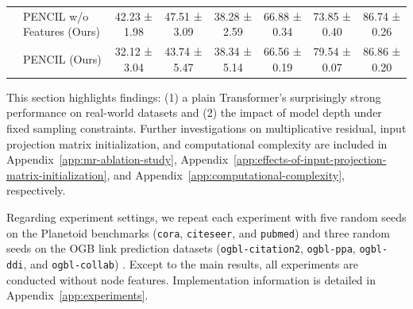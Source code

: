\documentclass{article}
\theoremstyle{plain}
\theoremstyle{definition}
\theoremstyle{remark}
\begin{document}
\begin{table}[t]
{\begin{tabular}{@{}clcccccc@{}}
             & PENCIL w/o Features (Ours) & {\color{firstbest} 42.23 ± 1.98}    & 47.51 ± 3.09                        & 38.28 ± 2.59                        & {\color{thirdbest} 66.88 ± 0.34}    & {\color{thirdbest} 73.85 ± 0.40}    & 86.74 ± 0.26                        \\
             & PENCIL (Ours)             & 32.12 ± 3.04                        & 43.74 ± 5.47                        & {\color{thirdbest} 38.34 ± 5.14}    & 66.56 ± 0.19                        & {\color{firstbest} 79.54 ± 0.07}    & 86.86 ± 0.20                        \\ \bottomrule
    \end{tabular}%
    }
\end{table}

This section highlights findings: (1) a plain Transformer's surprisingly strong performance on real-world datasets and (2) the impact of model depth under fixed sampling constraints. Further investigations on multiplicative residual, input projection matrix initialization, and computational complexity are included in Appendix~\ref{app:mr-ablation-study}, Appendix~\ref{app:effects-of-input-projection-matrix-initialization}, and Appendix~\ref{app:computational-complexity}, respectively.

Regarding experiment settings, we repeat each experiment with five random seeds on the Planetoid benchmarks (\texttt{cora}, \texttt{citeseer}, and \texttt{pubmed}) \cite{yang_revisiting_2016} and three random seeds on the OGB link prediction datasets (\texttt{ogbl-citation2}, \texttt{ogbl-ppa}, \texttt{ogbl-ddi}, and \texttt{ogbl-collab}) \cite{hu2020ogb}. Except to the main results, all experiments are conducted without node features. Implementation information is detailed in Appendix~\ref{app:experiments}.
\end{document}
